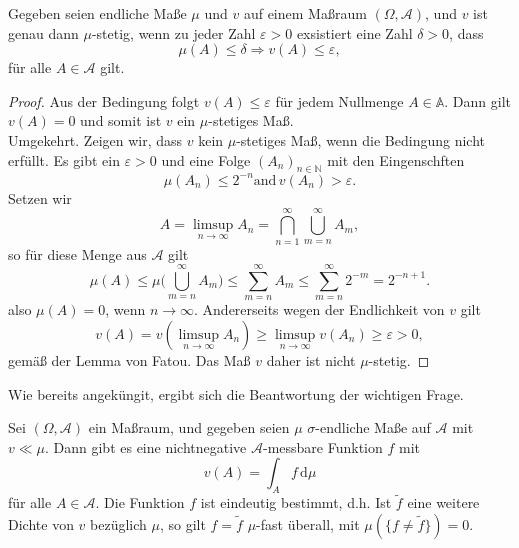 \documentclass[/Users/zhangwusheng/Documents/satz von radon nikodym/satz von radon nikodym.tex]{subfiles}
\begin{document}
    \begin{theorem}
        Gegeben seien endliche Maße $\mu$ und $v$ auf einem Maßraum $(\Omega, \mathcal{A})$, und $v$ ist genau dann $\mu$-stetig, wenn zu jeder Zahl $\varepsilon > 0$ exsistiert eine Zahl $\delta > 0$, dass 
        \[\mu(A)\leq \delta \Longrightarrow v(A) \leq \varepsilon,\]
        für alle $A \in \mathcal{A}$ gilt. 
    \end{theorem} 
    
    \begin{proof}
        Aus der Bedingung folgt $v(A) \leq \varepsilon$ für jedem Nullmenge $A \in \mathbb{A}$. Dann gilt $v(A)=0$ und somit ist $v$ ein $\mu$-stetiges Maß.\\
        Umgekehrt. Zeigen wir, dass $v$ kein $\mu$-stetiges Maß, wenn die Bedingung nicht erfüllt. Es gibt ein $\varepsilon > 0$ und eine Folge $(A_n)_{n \in \mathbb{N}}$ mit den Eingenschften
        \[\mu(A_n) \leq 2^{-n} \text{and}\, v(A_n) > \varepsilon.\]
        Setzen wir 
        \[A = \limsup_{n \to \infty} A_n = \bigcap_{n=1}^\infty \bigcup_{m=n}^\infty A_m,\]
        so für diese Menge aus $\mathcal{A}$ gilt 
        \[\mu(A)\leq \mu\bigl(\bigcup_{m=n}^\infty A_m\bigr) \leq \sum_{m=n}^\infty A_m \leq \sum_{m=n}^\infty 2^{-m} = 2^{-n+1}.\]
        also $\mu(A) =0$, wenn $n \rightarrow \infty$. Andererseits wegen der Endlichkeit von $v$ gilt  
        \[v(A) =v(\limsup_{n \to \infty} A_n) \geq \limsup_{n \to \infty} v(A_n) \geq \varepsilon > 0,\]
        gemäß der Lemma von Fatou.  Das Maß $v$ daher ist nicht $\mu$-stetig.
    \end{proof}

    Wie bereits angeküngit, ergibt sich die Beantwortung der wichtigen Frage.

    \begin{mdframed}[style=mdfexample]
        \begin{theorem}\label{satz:6}
            Sei $(\Omega, \mathcal{A})$ ein Maßraum, und gegeben seien $\mu$ $\sigma$-endliche Maße auf $\mathcal{A}$ mit $v \ll \mu$. 
            Dann gibt es eine nichtnegative $\mathcal{A}$-messbare Funktion $f$ mit
            \[v(A) = \int_{A} f\,\mathrm{d}\mu\]
            für alle $A \in \mathcal{A}$.
            Die Funktion $f$ ist eindeutig bestimmt, d.h. Ist $\tilde{f}$ eine weitere Dichte von $v$ bezüglich $\mu$,
            so gilt $f = \tilde{f}$ $\mu$-fast überall, mit $\mu(\{f \neq \tilde{f}\}) = 0$.
        \end{theorem}
    \end{mdframed}
\end{document}
